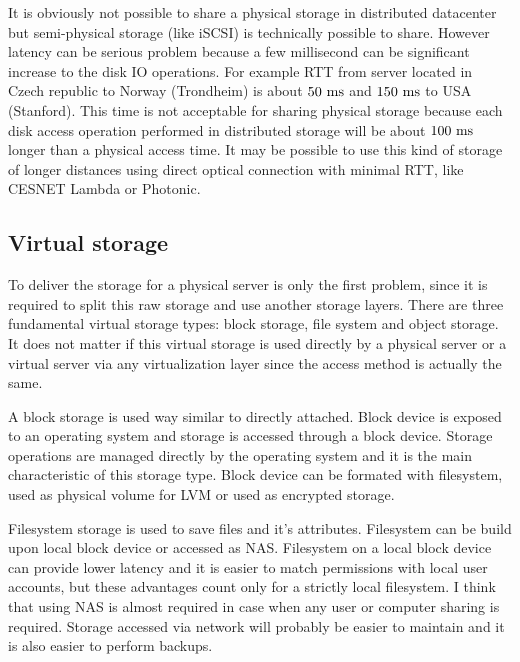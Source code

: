 It is obviously not possible to share a physical storage in distributed datacenter but semi-physical storage (like \Ac{iSCSI}) is technically possible to share. However latency can be serious problem because a few millisecond can be significant increase to the disk \Ac{IO} operations. For example \Ac{RTT} from server located in Czech republic to Norway (Trondheim) is about $50~\mathrm{ms}$ and $150~\mathrm{ms}$ to USA (Stanford). This time is not acceptable for sharing physical storage because each disk access operation performed in distributed storage will be about $100~\mathrm{ms}$ longer than a physical access time. It may be possible to use this kind of storage of longer distances using direct optical connection with minimal \Ac{RTT}, like CESNET Lambda or Photonic.

\subsection{Virtual storage}

To deliver the storage for a physical server is only the first problem, since it is required to split this raw storage and use another storage layers. There are three fundamental virtual storage types: block storage, file system and object storage. It does not matter if this virtual storage is used directly by a physical server or a virtual server via any virtualization layer since the access method is actually the same.

A block storage is used way similar to directly attached. Block device is exposed to an operating system and storage is accessed through a block device. Storage operations are managed directly by the operating system and it is the main characteristic of this storage type. Block device can be formated with filesystem, used as physical volume for \Ac{LVM} or used as encrypted storage.

Filesystem storage is used to save files and it's attributes. Filesystem can be build upon local block device or accessed as \Ac{NAS}. Filesystem on a local block device can provide lower latency and it is easier to match permissions with local user accounts, but these advantages count only for a strictly local filesystem. I think that using \Ac{NAS} is almost required in case when any user or computer sharing is required. Storage accessed via network will probably be easier to maintain and it is also easier to perform backups. 

